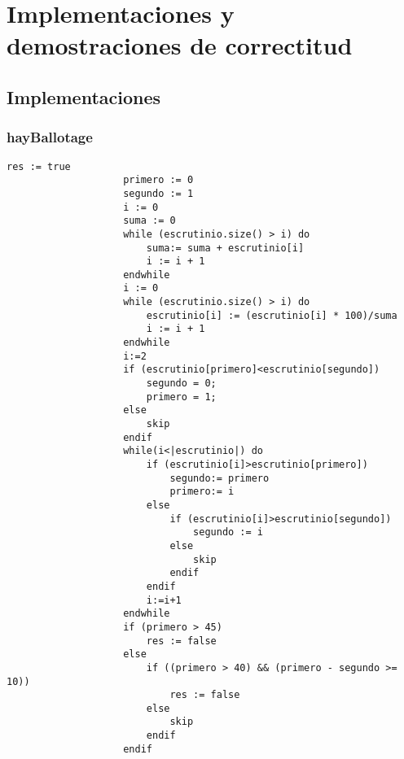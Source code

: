 \documentclass[10pt,a4paper]{article}
\begin{document}

	





	


\section{Implementaciones y demostraciones de correctitud}

	\subsection{Implementaciones}
		
		\subsubsection{hayBallotage}
			\begin{minipage}[t]{\textwidth}
				\begin{lstlisting}[label=code:for]
					res := true
					primero := 0
					segundo := 1
					i := 0
					suma := 0
					while (escrutinio.size() > i) do
						suma:= suma + escrutinio[i]
						i := i + 1
					endwhile
					i := 0
					while (escrutinio.size() > i) do
						escrutinio[i] := (escrutinio[i] * 100)/suma
						i := i + 1
					endwhile
                    i:=2
                    if (escrutinio[primero]<escrutinio[segundo])
                        segundo = 0;
                        primero = 1;
                    else
                        skip
                    endif
                    while(i<|escrutinio|) do 
                        if (escrutinio[i]>escrutinio[primero]) 
                            segundo:= primero
                            primero:= i 
                        else 
                            if (escrutinio[i]>escrutinio[segundo])
                                segundo := i
                            else
                                skip
                            endif
                        endif 
                        i:=i+1 
                    endwhile 
					if (primero > 45)
						res := false
					else
						if ((primero > 40) && (primero - segundo >= 10))
							res := false
						else
							skip
						endif
					endif

				\end{lstlisting}
			\end{minipage}
\end{document}
